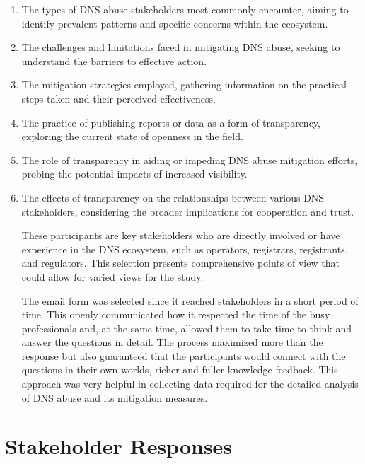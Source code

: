  \begin{enumerate}
  \item The types of DNS abuse stakeholders most commonly encounter, aiming to identify prevalent patterns and specific concerns within the ecosystem.
  
  \item The challenges and limitations faced in mitigating DNS abuse, seeking to understand the barriers to effective action.
  
  \item The mitigation strategies employed, gathering information on the practical steps taken and their perceived effectiveness.
  
  \item The practice of publishing reports or data as a form of transparency, exploring the current state of openness in the field.
  
  \item The role of transparency in aiding or impeding DNS abuse mitigation efforts, probing the potential impacts of increased visibility.
  
  \item  The effects of transparency on the relationships between various DNS stakeholders, considering the broader implications for cooperation and trust.

  These participants are key stakeholders who are directly involved or have experience in the DNS ecosystem, such as operators, registrars, registrants, and regulators. This selection presents comprehensive points of view that could allow for varied views for the study.

  The email form was selected since it reached stakeholders in a short period of time. This openly communicated how it respected the time of the busy professionals and, at the same time, allowed them to take time to think and answer the questions in detail. The process maximized more than the response but also guaranteed that the participants would connect with the questions in their own worlds, richer and fuller knowledge feedback. This approach was very helpful in collecting data required for the detailed analysis of DNS abuse and its mitigation measures.

 
\end{enumerate}


\section{Stakeholder Responses} 

